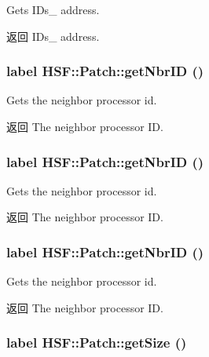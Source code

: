 Gets IDs\_\- address. \begin{DoxyReturn}{返回}
IDs\_\- address. 
\end{DoxyReturn}
\hypertarget{classHSF_1_1Patch_ab3cc0b6c67fc04242ce059e4b2121352}{
\subsubsection[{getNbrID}]{\setlength{\rightskip}{0pt plus 5cm}label HSF::Patch::getNbrID ()}}
\label{classHSF_1_1Patch_ab3cc0b6c67fc04242ce059e4b2121352}


Gets the neighbor processor id. \begin{DoxyReturn}{返回}
The neighbor processor ID. 
\end{DoxyReturn}
\hypertarget{classHSF_1_1Patch_ab3cc0b6c67fc04242ce059e4b2121352}{
\subsubsection[{getNbrID}]{\setlength{\rightskip}{0pt plus 5cm}label HSF::Patch::getNbrID ()}}
\label{classHSF_1_1Patch_ab3cc0b6c67fc04242ce059e4b2121352}


Gets the neighbor processor id. \begin{DoxyReturn}{返回}
The neighbor processor ID. 
\end{DoxyReturn}
\hypertarget{classHSF_1_1Patch_ab3cc0b6c67fc04242ce059e4b2121352}{
\subsubsection[{getNbrID}]{\setlength{\rightskip}{0pt plus 5cm}label HSF::Patch::getNbrID ()}}
\label{classHSF_1_1Patch_ab3cc0b6c67fc04242ce059e4b2121352}


Gets the neighbor processor id. \begin{DoxyReturn}{返回}
The neighbor processor ID. 
\end{DoxyReturn}
\hypertarget{classHSF_1_1Patch_a2710e0b6ccba9c2a5462d77a83a077ba}{
\subsubsection[{getSize}]{\setlength{\rightskip}{0pt plus 5cm}label HSF::Patch::getSize ()}}
\label{classHSF_1_1Patch_a2710e0b6ccba9c2a5462d77a83a077ba}


